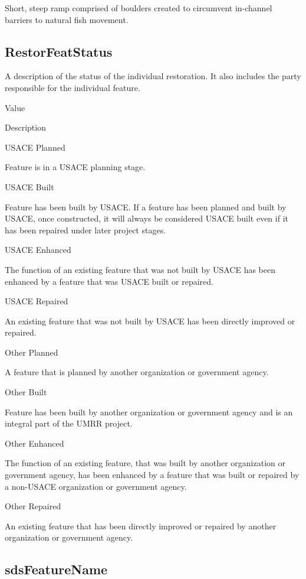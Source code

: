 \documentclass[
  letterpaper,
  DIV=11,
  numbers=noendperiod]{scrreprt}
\begin{document}
Short, steep ramp comprised of boulders created to circumvent in-channel
barriers to natural fish movement.

\subsection{RestorFeatStatus}\label{restorfeatstatus-3}

A description of the status of the individual restoration. It also
includes the party responsible for the individual feature.

Value

Description

USACE Planned

Feature is in a USACE planning stage.

USACE Built

Feature has been built by USACE. If a feature has been planned and built
by USACE, once constructed, it will always be considered USACE built
even if it has been repaired under later project stages.

USACE Enhanced

The function of an existing feature that was not built by USACE has been
enhanced by a feature that was USACE built or repaired.

USACE Repaired

An existing feature that was not built by USACE has been directly
improved or repaired.

Other Planned

A feature that is planned by another organization or government agency.

Other Built

Feature has been built by another organization or government agency and
is an integral part of the UMRR project.

Other Enhanced

The function of an existing feature, that was built by another
organization or government agency, has been enhanced by a feature that
was built or repaired by a non-USACE organization or government agency.

Other Repaired

An existing feature that has been directly improved or repaired by
another organization or government agency.

\subsection{sdsFeatureName}\label{sdsfeaturename-3}
\end{document}
